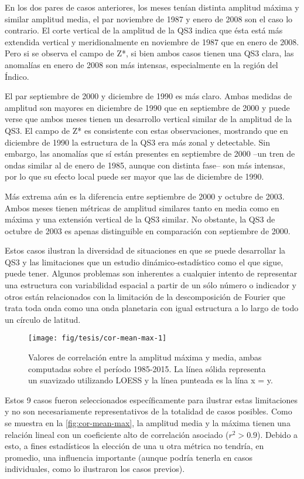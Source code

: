 \documentclass[spanish,a4paper,12pt]{book}
\begin{document}
En los dos pares de casos anteriores, los meses tenían distinta amplitud
máxima y similar amplitud media, el par noviembre de 1987 y enero de
2008 son el caso lo contrario. El corte vertical de la amplitud de la
QS3 indica que ésta está más extendida vertical y meridionalmente en
noviembre de 1987 que en enero de 2008. Pero si se observa el campo de
Z*, si bien ambos casos tienen una QS3 clara, las anomalías en enero de
2008 son más intensas, especialmente en la región del Índico.

El par septiembre de 2000 y diciembre de 1990 es más claro. Ambas
medidas de amplitud son mayores en diciembre de 1990 que en septiembre
de 2000 y puede verse que ambos meses tienen un desarrollo vertical
similar de la amplitud de la QS3. El campo de Z* es consistente con
estas observaciones, mostrando que en diciembre de 1990 la estructura de
la QS3 era más zonal y detectable. Sin embargo, las anomalías que sí
están presentes en septiembre de 2000 --un tren de ondas similar al de
enero de 1985, aunque con distinta fase-- son más intensas, por lo que
su efecto local puede ser mayor que las de diciembre de 1990.

Más extrema aún es la diferencia entre septiembre de 2000 y octubre de
2003. Ambos meses tienen métricas de amplitud similares tanto en media
como en máxima y una extensión vertical de la QS3 similar. No obstante,
la QS3 de octubre de 2003 es apenas distinguible en comparación con
septiembre de 2000.

Estos casos ilustran la diversidad de situaciones en que se puede
desarrollar la QS3 y las limitaciones que un estudio
dinámico-estadístico como el que sigue, puede tener. Algunos problemas
son inherentes a cualquier intento de representar una estructura con
variabilidad espacial a partir de un sólo número o indicador y otros
están relacionados con la limitación de la descomposición de Fourier que
trata toda onda como una onda planetaria con igual estructura a lo largo
de todo un círculo de latitud.

\begin{figure*}
\texttt{[image: fig/tesis/cor-mean-max-1]} \caption{Valores de correlación entre la amplitud máxima y media, ambas computadas sobre el período 1985-2015. La línea sólida representa un suavizado utilizando LOESS y la línea punteada es la lína x = y.}\label{fig:cor-mean-max}
\end{figure*}

Estos 9 casos fueron seleccionados específicamente para ilustrar estas
limitaciones y no son necesariamente representativos de la totalidad de
casos posibles. Como se muestra en la \autoref{fig:cor-mean-max}, la
amplitud media y la máxima tienen una relación lineal con un coeficiente
alto de correlación asociado (\(r^2>0.9\)). Debido a esto, a fines
estadísticos la elección de una u otra métrica no tendría, en promedio,
una influencia importante (aunque podría tenerla en casos individuales,
como lo ilustraron los casos previos).
\end{document}
